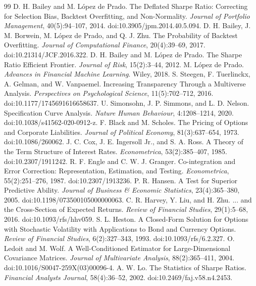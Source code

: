 \documentclass{asrpaper}
\begin{document}
\balance
\begin{thebibliography}{99}\small
{} D. H. Bailey and M. L\'opez de Prado. The Deflated Sharpe Ratio: Correcting for Selection Bias, Backtest Overfitting, and Non-Normality. \emph{Journal of Portfolio Management}, 40(5):94--107, 2014. doi:10.3905/jpm.2014.40.5.094.
 D. H. Bailey, J. M. Borwein, M. L\'opez de Prado, and Q. J. Zhu. The Probability of Backtest Overfitting. \emph{Journal of Computational Finance}, 20(4):39--69, 2017. doi:10.21314/JCF.2016.322.
 D. H. Bailey and M. L\'opez de Prado. The Sharpe Ratio Efficient Frontier. \emph{Journal of Risk}, 15(2):3--44, 2012.
 M. L\'opez de Prado. \emph{Advances in Financial Machine Learning}. Wiley, 2018.
 S. Steegen, F. Tuerlinckx, A. Gelman, and W. Vanpaemel. Increasing Transparency Through a Multiverse Analysis. \emph{Perspectives on Psychological Science}, 11(5):702--712, 2016. doi:10.1177/1745691616658637.
 U. Simonsohn, J. P. Simmons, and L. D. Nelson. Specification Curve Analysis. \emph{Nature Human Behaviour}, 4:1208--1214, 2020. doi:10.1038/s41562-020-0912-z.
 F. Black and M. Scholes. The Pricing of Options and Corporate Liabilities. \emph{Journal of Political Economy}, 81(3):637--654, 1973. doi:10.1086/260062.
 J. C. Cox, J. E. Ingersoll Jr., and S. A. Ross. A Theory of the Term Structure of Interest Rates. \emph{Econometrica}, 53(2):385--407, 1985. doi:10.2307/1911242.
 R. F. Engle and C. W. J. Granger. Co-integration and Error Correction: Representation, Estimation, and Testing. \emph{Econometrica}, 55(2):251--276, 1987. doi:10.2307/1913236.
 P. R. Hansen. A Test for Superior Predictive Ability. \emph{Journal of Business \& Economic Statistics}, 23(4):365--380, 2005. doi:10.1198/073500105000000063.
 C. R. Harvey, Y. Liu, and H. Zhu. ... and the Cross-Section of Expected Returns. \emph{Review of Financial Studies}, 29(1):5--68, 2016. doi:10.1093/rfs/hhv059.
 S. L. Heston. A Closed-Form Solution for Options with Stochastic Volatility with Applications to Bond and Currency Options. \emph{Review of Financial Studies}, 6(2):327--343, 1993. doi:10.1093/rfs/6.2.327.
 O. Ledoit and M. Wolf. A Well-Conditioned Estimator for Large-Dimensional Covariance Matrices. \emph{Journal of Multivariate Analysis}, 88(2):365--411, 2004. doi:10.1016/S0047-259X(03)00096-4.
 A. W. Lo. The Statistics of Sharpe Ratios. \emph{Financial Analysts Journal}, 58(4):36--52, 2002. doi:10.2469/faj.v58.n4.2453.

\end{thebibliography}
\end{document}
